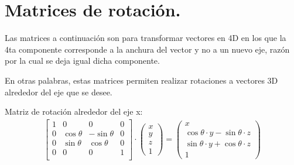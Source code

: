 \newcommand{\ctheta}{\cos{\theta}}
\newcommand{\stheta}{\sin{\theta}}
\newcommand{\p}{\cdot}

\maketitle

\section{Matrices de rotación.}
    Las matrices a continuación son para transformar
vectores en 4D en los que la 4ta componente corresponde
a la anchura del vector y no a un nuevo eje, razón por la
cual se deja igual dicha componente.\par
    En otras palabras, estas matrices permiten realizar
rotaciones a vectores 3D alrededor del eje que se desee.\par

Matriz de rotación alrededor del eje x:
\begin{align*}
    \begin{bmatrix}
        1 & 0 & 0 & 0 \\
        0 & \ctheta & -\stheta & 0 \\
        0 & \stheta & \ctheta & 0 \\
        0 & 0 & 0 & 1 \\
    \end{bmatrix} \cdot
    \begin{pmatrix} x \\ y \\ z \\ 1 \end{pmatrix} = 
    \begin{pmatrix} x \\
                    \ctheta \p y - \stheta \p z \\
                    \stheta \p y + \ctheta \p z \\ 
                    1\end{pmatrix}
\end{align*}


